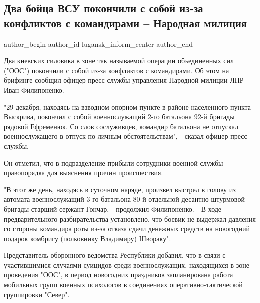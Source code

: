  
 
 
 
 
 
\subsection{Два бойца ВСУ покончили с собой из-за конфликтов с командирами – Народная милиция}
\label{sec:30_12_2020.news.lnr.lug_info.lugansk_inform_center.1.vsu_samoubijstva}
\ifcmt
	author_begin
   author_id lugansk_inform_center
	author_end
\fi


Два киевских силовика в зоне так называемой операции объединенных сил ("ООС")
покончили с собой из-за конфликтов с командирами. Об этом на брифинге сообщил
офицер пресс-службы управления Народной милиции ЛНР Иван Филипоненко.

"29 декабря, находясь на взводном опорном пункте в районе населенного пункта
Выскрива, покончил с собой военнослужащий 2-го батальона 92-й бригады рядовой
Ефременюк. Со слов сослуживцев, командир батальона не отпускал военнослужащего
в отпуск по личным обстоятельствам", - сказал офицер пресс-службы.

Он отметил, что в подразделение прибыли сотрудники военной службы правопорядка
для выяснения причин происшествия. 

"В этот же день, находясь в суточном наряде, произвел выстрел в голову из
автомата военнослужащий 3-го батальона 80-й отдельной десантно-штурмовой
бригады старший сержант Гончар, - продолжил Филипоненко. - В ходе
предварительного разбирательства установлено, что боевик не выдержал давления
со стороны командира роты из-за отказа сдачи денежных средств на новогодний
подарок комбригу (полковнику Владимиру) Швораку".

Представитель оборонного ведомства Республики добавил, что в связи с
участившимися случаями суицидов среди военнослужащих, находящихся в зоне
проведения "ООС", в период новогодних праздников запланирована работа мобильных
групп военных психологов в соединениях оперативно-тактической группировки
"Север".

